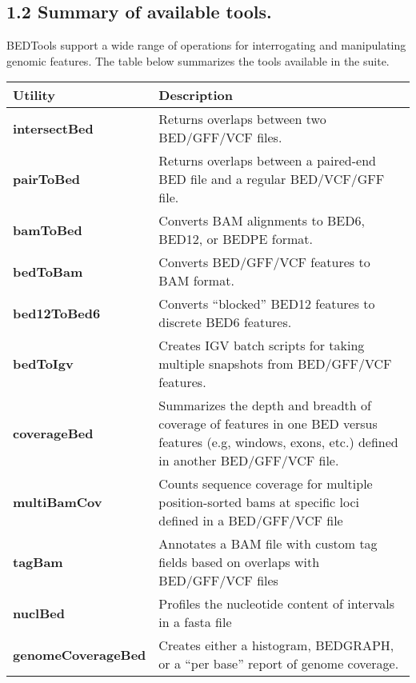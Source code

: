 \documentclass[letterpaper,10pt,english]{sphinxmanual}
\begin{document}
\subsection{1.2 Summary of available tools.}
\label{content/overview:summary-of-available-tools}
BEDTools support a  wide range of operations for  interrogating and manipulating genomic features. The table below summarizes
the tools available in the suite.

\begin{tabulary}{\linewidth}{|L|L|}
\hline
\textbf{
Utility
} & \textbf{
Description
}\\\hline

\textbf{intersectBed}
 & 
Returns overlaps between two BED/GFF/VCF files.
\\\hline

\textbf{pairToBed}
 & 
Returns overlaps between a paired-end BED file and a regular BED/VCF/GFF file.
\\\hline

\textbf{bamToBed}
 & 
Converts BAM alignments to BED6, BED12, or BEDPE format.
\\\hline

\textbf{bedToBam}
 & 
Converts BED/GFF/VCF features to BAM format.
\\\hline

\textbf{bed12ToBed6}
 & 
Converts ``blocked'' BED12 features to discrete BED6 features.
\\\hline

\textbf{bedToIgv}
 & 
Creates IGV batch scripts for taking multiple snapshots from BED/GFF/VCF features.
\\\hline

\textbf{coverageBed}
 & 
Summarizes the depth and breadth of coverage of features in one BED versus features (e.g, windows, exons, etc.) defined in another BED/GFF/VCF file.
\\\hline

\textbf{multiBamCov}
 & 
Counts sequence coverage for multiple position-sorted bams at specific loci defined in a BED/GFF/VCF file
\\\hline

\textbf{tagBam}
 & 
Annotates a BAM file with custom tag fields based on overlaps with BED/GFF/VCF files
\\\hline

\textbf{nuclBed}
 & 
Profiles the nucleotide content of intervals in a fasta file
\\\hline

\textbf{genomeCoverageBed}
 & 
Creates either a histogram, BEDGRAPH, or a ``per base'' report of genome coverage.
\\\hline


\end{tabulary}
\end{document}
